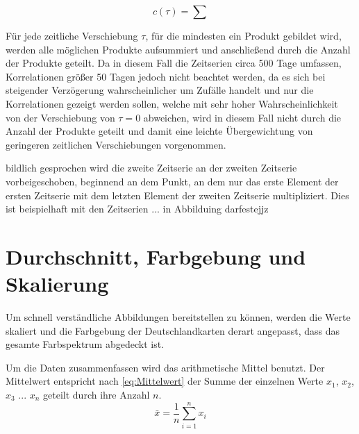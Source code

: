 \begin{equation}
    c(\tau) = \sum
\end{equation}

Für jede zeitliche Verschiebung $\tau$, für die mindesten ein Produkt gebildet wird, werden alle möglichen Produkte aufsummiert und anschließend durch die Anzahl der Produkte geteilt.
Da in diesem Fall die Zeitserien circa 500 Tage umfassen, Korrelationen größer 50 Tagen jedoch nicht beachtet werden, da es sich bei steigender Verzögerung wahrscheinlicher um Zufälle handelt und nur die Korrelationen gezeigt werden sollen, welche mit sehr hoher Wahrscheinlichkeit von der Verschiebung von $\tau = 0$ abweichen, wird in diesem Fall nicht durch die Anzahl der Produkte geteilt und damit eine leichte Übergewichtung von geringeren zeitlichen Verschiebungen vorgenommen.

bildlich gesprochen wird die zweite Zeitserie an der zweiten Zeitserie vorbeigeschoben, beginnend an dem Punkt, an dem nur das erste Element der ersten Zeitserie mit dem letzten Element der zweiten Zeitserie multipliziert. Dies ist beispielhaft mit den Zeitserien ... in Abbilduing darfestejjz




\section{Durchschnitt, Farbgebung und Skalierung}\label{sec:Durchschnitt, Farbgebung und Skalierung}
Um schnell verständliche Abbildungen bereitstellen zu können, werden die Werte skaliert und die Farbgebung der Deutschlandkarten derart angepasst, dass das gesamte Farbspektrum abgedeckt ist.


Um die Daten zusammenfassen wird das arithmetische Mittel benutzt. Der Mittelwert entspricht nach \autoref{eq:Mittelwert} der Summe der einzelnen Werte $x_1$, $x_2$, $x_3$ ... $x_n$ geteilt durch ihre Anzahl $n$.
\begin{equation}\label{eq:Mittelwert}
    \bar x = \frac{1}{n}\sum_{i=1}^n x_i
\end{equation}